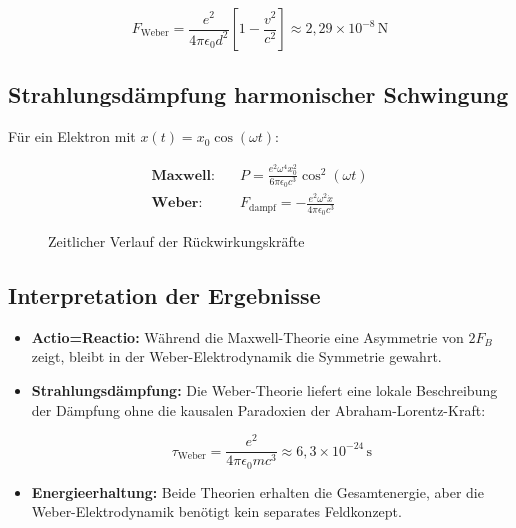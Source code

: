 \begin{equation}
F_{\text{Weber}} = \frac{e^2}{4\pi\epsilon_0 d^2}\left[1 - \frac{v^2}{c^2}\right] \approx 2,\!29\times10^{-8}\,\text{N}
\end{equation}

\subsection{Strahlungsdämpfung harmonischer Schwingung}

Für ein Elektron mit $x(t) = x_0\cos(\omega t)$:

\begin{align}
\textbf{Maxwell:}\quad & P = \frac{e^2\omega^4 x_0^2}{6\pi\epsilon_0 c^3}\cos^2(\omega t) \\
\textbf{Weber:}\quad & F_{\text{dampf}} = -\frac{e^2\omega^2\dot{x}}{4\pi\epsilon_0 c^3}
\end{align}

\begin{figure}[ht]
\centering
{}
\caption{Zeitlicher Verlauf der Rückwirkungskräfte}
\end{figure}

\subsection{Interpretation der Ergebnisse}

\begin{itemize}
\item \textbf{Actio=Reactio:} Während die Maxwell-Theorie eine Asymmetrie von $2F_B$ zeigt, bleibt in der Weber-Elektrodynamik die Symmetrie gewahrt.

\item \textbf{Strahlungsdämpfung:} Die Weber-Theorie liefert eine lokale Beschreibung der Dämpfung ohne die kausalen Paradoxien der Abraham-Lorentz-Kraft:

\begin{equation}
\tau_{\text{Weber}} = \frac{e^2}{4\pi\epsilon_0 m c^3} \approx 6,\!3\times10^{-24}\,\text{s}
\end{equation}

\item \textbf{Energieerhaltung:} Beide Theorien erhalten die Gesamtenergie, aber die Weber-Elektrodynamik benötigt kein separates Feldkonzept.
\end{itemize}

